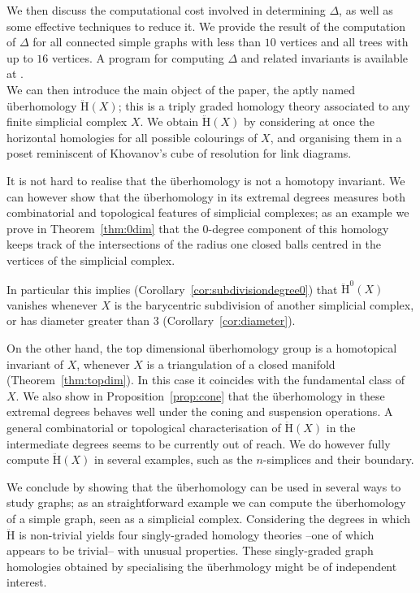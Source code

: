 \documentclass[11pt, a4paper, reqno, twoside, makeidx]{amsart}
\theoremstyle{remark}
\theoremstyle{plain}
\theoremstyle{definition}
\newcommand{\uH}{\ddot{\mathrm{H}}}
\begin{document}
We then discuss the computational cost involved in determining $\Delta$, as well as some effective techniques to reduce it. 
We provide the result of the  computation of $\Delta$ for all connected simple graphs with less than $10$ vertices and all trees with up to $16$ vertices. A program for computing $\Delta$ and related invariants is available at \cite{miogithub}.\\

We can then introduce the main object of the paper, the aptly named \"uberhomology $\uH(X)$; this is a triply graded homology theory associated to any finite simplicial complex $X$. We obtain $\uH(X)$ by considering at once the horizontal homologies for all possible colourings of $X$, and organising them in a poset reminiscent of Khovanov's \cite{khovanov2000categorification} cube of resolution for link diagrams.

It is not hard to realise that the \"uberhomology is not a homotopy invariant.
We can however show that the \"uberhomology in its extremal degrees measures both combinatorial and topological features of simplicial complexes; as an example we prove in Theorem~\ref{thm:0dim} that the $0$-degree component of this homology keeps track of the intersections of the radius one closed balls centred in the vertices of the simplicial complex. 

In particular this implies (Corollary~\ref{cor:subdivisiondegree0}) that $\uH^0(X)$ vanishes whenever $X$ is the barycentric subdivision of another simplicial complex, or has diameter greater than $3$ (Corollary~\ref{cor:diameter}).

On the other hand, the top dimensional \"uberhomology group is a homotopical invariant of $X$, whenever $X$ is a triangulation of a closed manifold (Theorem~\ref{thm:topdim}). In this case it coincides with the fundamental class of $X$. 
We also show in Proposition~\ref{prop:cone} that the \"uberhomology in these extremal degrees behaves well under the coning and suspension operations.
A general combinatorial or topological characterisation of $\uH(X)$ in the intermediate degrees seems to be currently out of reach. We do however fully compute $\uH(X)$ in several examples, such as the $n$-simplices and their boundary. 

We conclude by showing that the \"uberhomology can be used in several ways to study graphs; as an straightforward example we can compute the \"uberhomology of a simple graph, seen as a simplicial complex. Considering the degrees in which $\uH$ is non-trivial yields four singly-graded homology theories --one of which appears to be trivial-- with unusual properties. These singly-graded graph homologies obtained by specialising the \"uberhmology might be of independent interest.
\end{document}
